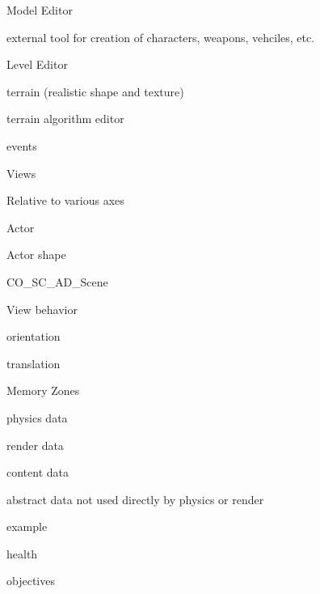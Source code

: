 \begin{DoxyItemize}
\begin{DoxyItemize}
\item Model Editor
\begin{DoxyItemize}
\item external tool for creation of characters, weapons, vehciles, etc.
\item 
\end{DoxyItemize}
\end{DoxyItemize}
\item 
\begin{DoxyItemize}
\item Level Editor
\begin{DoxyItemize}
\item terrain (realistic shape and texture)
\item terrain algorithm editor
\item events
\end{DoxyItemize}
\end{DoxyItemize}
\item Views
\begin{DoxyItemize}
\item Relative to various axes
\begin{DoxyItemize}
\item Actor
\item Actor shape
\item CO\_\-SC\_\-AD\_\-Scene
\end{DoxyItemize}
\item View behavior
\begin{DoxyItemize}
\item orientation
\item translation
\end{DoxyItemize}
\end{DoxyItemize}
\item Memory Zones
\begin{DoxyItemize}
\item physics data
\item render data
\item content data
\item abstract data not used directly by physics or render
\begin{DoxyItemize}
\item example
\begin{DoxyItemize}
\item health
\item objectives 
\end{DoxyItemize}
\end{DoxyItemize}
\end{DoxyItemize}
\end{DoxyItemize}